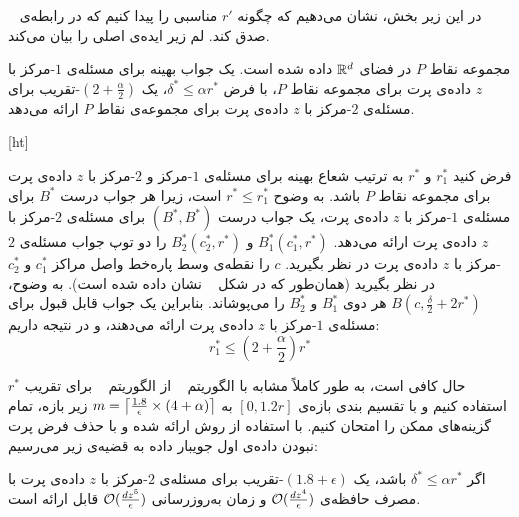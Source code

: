 
در این زیر بخش، نشان می‌دهیم که چگونه $r'$ مناسبی را پیدا کنیم که در رابطه‌ی ~ صدق کند. لم زیر ایده‌ی اصلی را بیان می‌کند.

مجموعه نقاط $P$ در فضای $\mathbb{R}^d$ داده شده است. یک جواب بهینه برای مسئله‌ی $1$-مرکز با $z$ داده‌ی پرت برای مجموعه نقاط $P$، با فرض $\delta^* \leq \alpha r^*$، یک $(2 + \frac{\alpha}{2})$-تقریب برای مسئله‌ی $2$-مرکز با $z$ داده‌ی پرت برای مجموعه‌ی نقاط $P$ ارائه می‌دهد.

[ht]


فرض کنید $r_1^*$ و $r^*$ به ترتیب شعاع بهینه برای مسئله‌ی $1$-مرکز و $2$-مرکز با $z$ داده‌ی پرت برای مجموعه نقاط $P$ باشد.
به وضوح $r^* \leq r_1^*$ است، زیرا هر جواب درست $B^*$ برای مسئله‌ی $1$-مرکز با $z$ داده‌ی پرت، یک جواب درست $(B^*, B^*)$ برای مسئله‌ی $2$-مرکز با $z$ داده‌ی پرت ارائه می‌دهد. $B_1^*(c_1^*, r^*)$ و $B_2^*(c_2^*, r^*)$ را دو توپ جواب مسئله‌ی $2$-مرکز با $z$ داده‌ی پرت در نظر بگیرید. $c$ را نقطه‌ی وسط پاره‌خط واصل مراکز $c_1^*$ و $c_2^*$ در نظر بگیرید (همان‌طور که در شکل ~ نشان داده شده است).
به وضوح، $B(c, \frac{\delta}{2} + 2r^*)$ هر دوی $B_1^*$ و $B_2^*$ را می‌پوشاند.
بنابراین یک جواب قابل قبول برای مسئله‌ی $1$-مرکز با $z$ داده‌ی پرت ارائه می‌دهند، و در نتیجه داریم:
$$r_1^* \leq (2 + \frac{\alpha}{2})r^*$$ 



حال کافی است، به طور کاملاً مشابه با الگوریتم ~ از الگوریتم ~ برای تقریب $r^*$ استفاده کنیم و با تقسیم بندی بازه‌ی $[0, 1.2r]$ به $m = \left\lceil{\frac{1.8}{\epsilon} \times (4 + \alpha)}\right\rceil$ زیر بازه، تمام گزینه‌های ممکن را امتحان کنیم.
با استفاده از روش ارائه شده و با حذف فرض پرت نبودن داده‌ی اول جویبار داده به قضیه‌ی زیر می‌رسیم:


اگر $\delta^* \leq \alpha r^*$ باشد، یک $(1.8 + \epsilon)$-تقریب برای مسئله‌ی $2$-مرکز با $z$ داده‌ی پرت با مصرف حافظه‌ی $\mathcal{O}(\frac{dz^4}{\epsilon})$ و زمان به‌روزرسانی $\mathcal{O}(\frac{dz^5}{\epsilon})$ قابل ارائه است.



